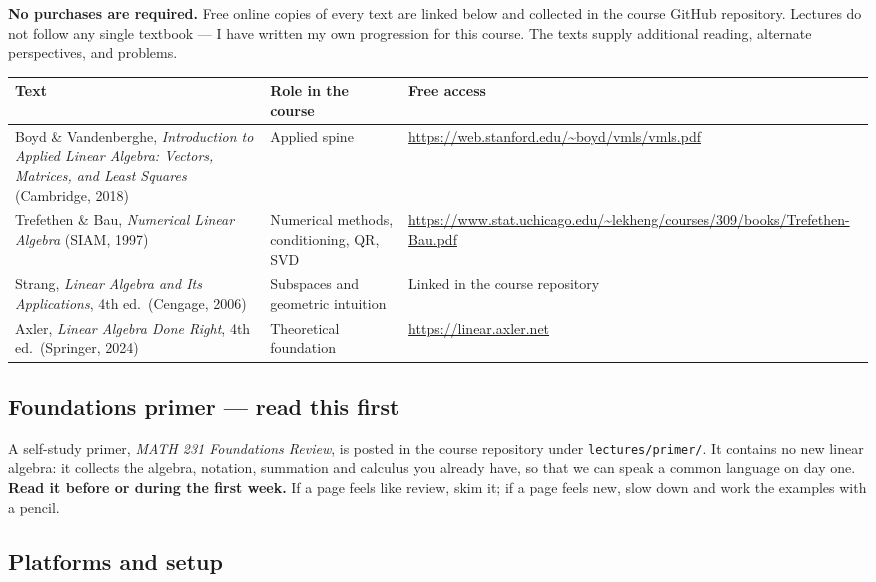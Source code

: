 \documentclass[11pt]{article}
\begin{document}
\textbf{No purchases are required.} Free online copies of every text are linked
below and collected in the course GitHub repository. Lectures do not follow any
single textbook --- I have written my own progression for this course. The
texts supply additional reading, alternate perspectives, and problems.

\renewcommand{\arraystretch}{1.3}
\begin{longtable}{@{} >{\raggedright\arraybackslash}p{6.4cm} >{\raggedright\arraybackslash}p{4.0cm} >{\raggedright\arraybackslash}p{5.0cm} @{}}
\toprule
\textbf{Text} & \textbf{Role in the course} & \textbf{Free access} \\
\midrule
\endhead
\bottomrule
\endlastfoot
Boyd \& Vandenberghe, \emph{Introduction to Applied Linear Algebra: Vectors,
Matrices, and Least Squares} (Cambridge, 2018)
 & Applied spine
 & \url{https://web.stanford.edu/~boyd/vmls/vmls.pdf} \\
Trefethen \& Bau, \emph{Numerical Linear Algebra} (SIAM, 1997)
 & Numerical methods, conditioning, QR, SVD
 & \url{https://www.stat.uchicago.edu/~lekheng/courses/309/books/Trefethen-Bau.pdf} \\
Strang, \emph{Linear Algebra and Its Applications}, 4th ed.\ (Cengage, 2006)
 & Subspaces and geometric intuition
 & Linked in the course repository \\
Axler, \emph{Linear Algebra Done Right}, 4th ed.\ (Springer, 2024)
 & Theoretical foundation
 & \url{https://linear.axler.net} \\
\end{longtable}

\subsection{Foundations primer --- read this first}

A self-study primer, \emph{MATH 231 Foundations Review}, is posted in the course
repository under \texttt{lectures/primer/}. It contains no new linear algebra:
it collects the algebra, notation, summation and calculus you already have, so
that we can speak a common language on day one. \textbf{Read it before or during
the first week.} If a page feels like review, skim it; if a page feels new, slow
down and work the examples with a pencil.

\subsection{Platforms and setup}
\end{document}
